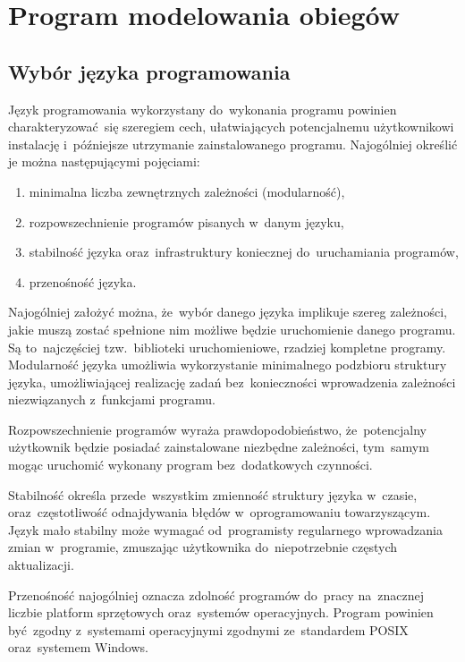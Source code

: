 \section{Program modelowania obiegów}

\subsection{Wybór języka programowania}

Język programowania wykorzystany do~wykonania programu powinien
charakteryzować~się szeregiem cech, ułatwiających potencjalnemu
użytkownikowi instalację i~późniejsze utrzymanie zainstalowanego
programu. Najogólniej określić je można następującymi pojęciami:

\begin{enumerate}

	\item minimalna liczba zewnętrznych zależności (modularność),

	\item rozpowszechnienie programów pisanych w~danym języku,

	\item stabilność języka oraz~infrastruktury koniecznej
	do~uruchamiania programów,

	\item przenośność języka.

\end{enumerate}

Najogólniej założyć można, że~wybór danego języka implikuje szereg
zależności, jakie muszą zostać spełnione nim możliwe będzie uruchomienie
danego programu. Są to~najczęściej tzw.~biblioteki uruchomieniowe,
rzadziej kompletne programy. Modularność języka umożliwia wykorzystanie
minimalnego podzbioru struktury języka, umożliwiającej realizację zadań
bez~konieczności wprowadzenia zależności niezwiązanych z~funkcjami
programu.

Rozpowszechnienie programów wyraża prawdopodobieństwo, że~potencjalny
użytkownik będzie posiadać zainstalowane niezbędne zależności, tym~samym
mogąc uruchomić wykonany program bez~dodatkowych czynności.

Stabilność określa przede~wszystkim zmienność struktury języka w~czasie,
oraz~częstotliwość odnajdywania błędów w~oprogramowaniu towarzyszącym.
Język mało stabilny może wymagać od~programisty regularnego wprowadzania
zmian w~programie, zmuszając użytkownika do~niepotrzebnie częstych
aktualizacji.

Przenośność najogólniej oznacza zdolność programów do~pracy na~znacznej
liczbie platform sprzętowych oraz~systemów operacyjnych. Program
powinien być~zgodny z~systemami operacyjnymi zgodnymi ze~standardem
POSIX oraz~systemem Windows.

